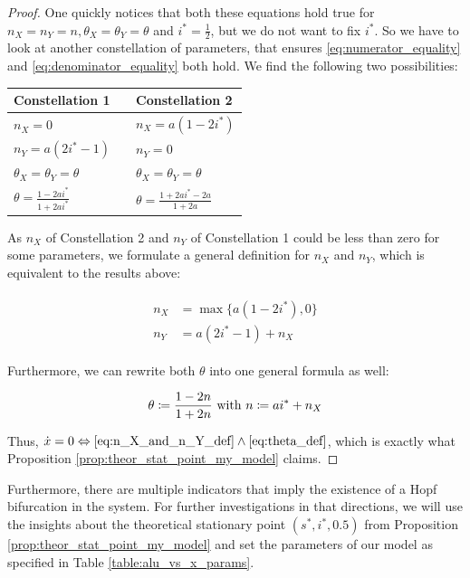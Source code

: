 \documentclass[12pt,a4paper,twoside]{article}
\begin{document}
\begin{proof}
	One quickly notices that both these equations hold true for $n_X = n_Y = n, \theta_X = \theta_Y = \theta$ and $i^* = \frac{1}{2}$, but we do not want to fix $i^*$. So we have to look at another constellation of parameters, that ensures \eqref{eq:numerator_equality} and \eqref{eq:denominator_equality} both hold. We find the following two possibilities:
	
	\begin{table}[h!]
	\centering
		\begin{tabular}{lll}
			Constellation 1 & & Constellation 2\\
			\hline
			$n_X = 0$ && $n_X = a(1-2i^*)$\\
			$n_Y = a(2i^*-1)$ && $n_Y = 0$ \\
			$\theta_X = \theta_Y = \theta$ && $\theta_X = \theta_Y = \theta$\\
			$\theta = \frac{1-2ai^*}{1+2ai^*}$ && $\theta = \frac{1+2ai^*-2a}{1+2a}$\\
		\end{tabular}
	\end{table}
	
	As $n_X$ of Constellation 2 and $n_Y$ of Constellation 1 could be less than zero for some parameters, we formulate a general definition for $n_X$ and $n_Y$, which is equivalent to the results above:
	
	\begin{align}\label{eq:n_X_and_n_Y_def}
	\begin{split}
		n_X &= \max \lbrace a\left(1-2i^*\right), 0\rbrace\\
		n_Y & = a\left(2i^* - 1\right) + n_X
		\end{split}
	\end{align}
	
	Furthermore, we can rewrite both $\theta$ into one general formula as well:
	
	\begin{equation}\label{eq:theta_def}
		\theta \coloneqq \frac{1-2n}{1+2n} \textnormal{ with }n \coloneqq ai^* + n_X
	\end{equation}
	
	Thus, $\dot{x} = 0 \Leftrightarrow \eqref{eq:n_X_and_n_Y_def} \land \eqref{eq:theta_def}$, which is exactly what Proposition \ref{prop:theor_stat_point_my_model} claims.
\end{proof}

Furthermore, there are multiple indicators that imply the existence of a Hopf bifurcation in the system. For further investigations in that directions, we will use the insights about the theoretical stationary point $\left(s^*, i^*, 0.5\right)$ from Proposition \ref{prop:theor_stat_point_my_model} and set the parameters of our model as specified in Table \ref{table:alu_vs_x_params}.
\end{document}
